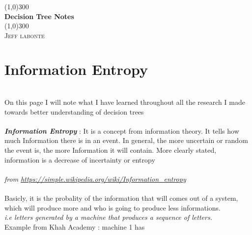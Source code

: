 \documentclass{article}
\begin{document}
  \begin{titlepage}
    \begin{center}
      \line(1,0){300} \\
      [0.25in]
      \huge{\bfseries Decision Tree Notes}\\
      [2mm]
      \line(1,0){300}\\
      [1.5cm]
      \textsc{\LARGE Jeff labonte}\\
      [0.75cm]
    \end{center}
  \end{titlepage}

  \section{Information Entropy}
    \ \\[2mm]
    On this page I will note what I have learned throughout all the research I made
    towards better understanding of decision trees\\
    \\
    \textit{\textbf{Information Entropy}} : It is a concept from information theory. It tells how much Information
    there is in an event. In general, the more uncertain or random the event is, the more Information
    it will contain. More clearly stated, information is a decrease of incertainty or entropy \\
    \\
    [2mm]
    \textit{from \url{https://simple.wikipedia.org/wiki/Information_entropy}}
    \\
    [2mm]
    \\
    Basicly, it is the probality of the information that will comes out of a system,
    which will produce more and who is going to produce less informations.
    \\
    \textit{i.e letters generated by a machine that produces a sequence of letters.} \\
    [4mm]
    Example from Khah Academy : machine 1 has \\
    \\
    \\
    \\
    \\
    \\
\end{document}

